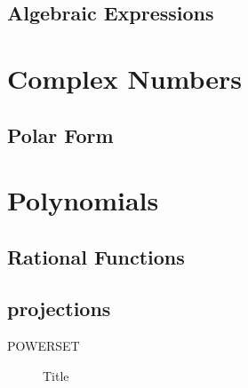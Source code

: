 \subsection{Algebraic Expressions}

\section{Complex Numbers}

\subsection{Polar Form}

\section{Polynomials}

\subsection{Rational Functions}

\subsection{projections}
POWERSET

\begin{figure}[t]
\begin{center}
\end{center}
\caption{Title}
\label{figlabel}
\end{figure}
